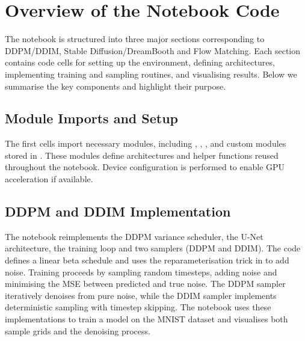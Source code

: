 

\section{Overview of the Notebook Code}

The notebook is structured into three major sections corresponding to
DDPM/DDIM, Stable Diffusion/DreamBooth and Flow Matching.  Each
section contains code cells for setting up the environment, defining
architectures, implementing training and sampling routines, and
visualising results.  Below we summarise the key components and
highlight their purpose.

\subsection{Module Imports and Setup}

The first cells import necessary modules, including ,
, , and custom modules stored in
.  These modules define architectures and helper
functions reused throughout the notebook.  Device configuration is
performed to enable GPU acceleration if available.

\subsection{DDPM and DDIM Implementation}

The notebook reimplements the DDPM variance scheduler, the U-Net
architecture, the training loop and two samplers (DDPM and DDIM).
The code defines a linear beta schedule and uses the
reparameterisation trick in  to add noise.
Training proceeds by sampling random timesteps, adding noise and
minimising the MSE between predicted and true noise.  The DDPM
sampler iteratively denoises from pure noise, while the DDIM sampler
implements deterministic sampling with timestep skipping.  The
notebook uses these implementations to train a model on the MNIST
dataset and visualises both sample grids and the denoising process.

